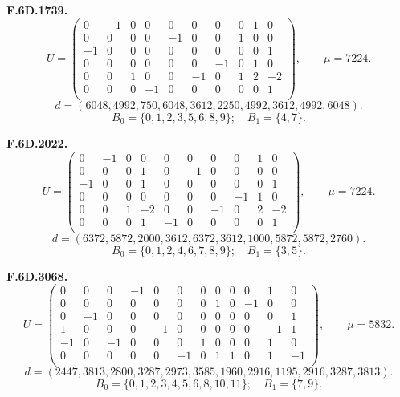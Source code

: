 \par\medskip\noindent\begin{minipage}{\linewidth}\textbf{F.6D.1739.}
\begingroup\small\setlength{\arraycolsep}{3pt}
\[U=\begin{pmatrix}
0 & -1 & 0 & 0 & 0 & 0 & 0 & 0 & 1 & 0\\
0 & 0 & 0 & 0 & -1 & 0 & 0 & 1 & 0 & 0\\
-1 & 0 & 0 & 0 & 0 & 0 & 0 & 0 & 0 & 1\\
0 & 0 & 0 & 0 & 0 & 0 & -1 & 0 & 1 & 0\\
0 & 0 & 1 & 0 & 0 & -1 & 0 & 1 & 2 & -2\\
0 & 0 & 0 & -1 & 0 & 0 & 0 & 0 & 0 & 1\\
\end{pmatrix},\qquad \mu=7224.\]
\[d=(6048,4992,750,6048,3612,2250,4992,3612,4992,6048).\]
\[B_0=\{0,1,2,3,5,6,8,9\};\quad B_1=\{4,7\}.\]
\endgroup\end{minipage}\par
\par\medskip\noindent\begin{minipage}{\linewidth}\textbf{F.6D.2022.}
\begingroup\small\setlength{\arraycolsep}{3pt}
\[U=\begin{pmatrix}
0 & -1 & 0 & 0 & 0 & 0 & 0 & 0 & 1 & 0\\
0 & 0 & 0 & 1 & 0 & -1 & 0 & 0 & 0 & 0\\
-1 & 0 & 0 & 1 & 0 & 0 & 0 & 0 & 0 & 1\\
0 & 0 & 0 & 0 & 0 & 0 & 0 & -1 & 1 & 0\\
0 & 0 & 1 & -2 & 0 & 0 & -1 & 0 & 2 & -2\\
0 & 0 & 0 & 1 & -1 & 0 & 0 & 0 & 0 & 1\\
\end{pmatrix},\qquad \mu=7224.\]
\[d=(6372,5872,2000,3612,6372,3612,1000,5872,5872,2760).\]
\[B_0=\{0,1,2,4,6,7,8,9\};\quad B_1=\{3,5\}.\]
\endgroup\end{minipage}\par
\par\medskip\noindent\begin{minipage}{\linewidth}\textbf{F.6D.3068.}
\begingroup\small\setlength{\arraycolsep}{3pt}
\[U=\begin{pmatrix}
0 & 0 & 0 & -1 & 0 & 0 & 0 & 0 & 0 & 0 & 1 & 0\\
0 & 0 & 0 & 0 & 0 & 0 & 0 & 1 & 0 & -1 & 0 & 0\\
0 & -1 & 0 & 0 & 0 & 0 & 0 & 0 & 0 & 0 & 0 & 1\\
1 & 0 & 0 & 0 & -1 & 0 & 0 & 0 & 0 & 0 & -1 & 1\\
-1 & 0 & -1 & 0 & 0 & 0 & 1 & 0 & 0 & 0 & 1 & 0\\
0 & 0 & 0 & 0 & 0 & -1 & 0 & 1 & 1 & 0 & 1 & -1\\
\end{pmatrix},\qquad \mu=5832.\]
\[d=(2447,3813,2800,3287,2973,3585,1960,2916,1195,2916,3287,3813).\]
\[B_0=\{0,1,2,3,4,5,6,8,10,11\};\quad B_1=\{7,9\}.\]
\endgroup\end{minipage}\par
